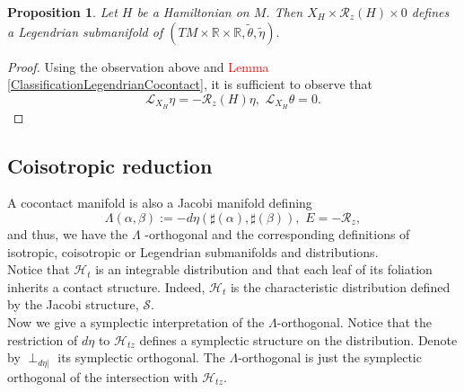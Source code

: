 \documentclass[12pt]{article}
\newtheorem{prop}{Proposition}[section]
\begin{document}
\begin{prop} Let $H$ be a Hamiltonian on $M$. Then $X_H \times \mathcal{R}_z(H) \times 0$ defines a Legendrian submanifold of $(TM \times \mathbb{R} \times \mathbb{R}, \widetilde \theta, \widetilde \eta).$
\end{prop}

 \begin{proof} Using the observation above and \textcolor{red}{Lemma \ref{ClassificationLegendrianCocontact}}, it is sufficient to observe that $$\mathcal{L}_{X_H}\eta = - \mathcal{R}_z(H) \eta, \,\, \mathcal{L}_{X_H}\theta =  0.$$
 \end{proof}


\subsection{Coisotropic reduction}
A cocontact manifold is also a Jacobi manifold defining $$\Lambda(\alpha, \beta) := -d\eta(\sharp(\alpha), \sharp(\beta)), \,\, E = -\mathcal{R}_z,$$ and thus, we have the $\Lambda$
-orthogonal and the corresponding definitions of isotropic, coiso\-tropic or Legendrian submanifolds and distributions.\\

Notice that $\mathcal{H}_t$ is an integrable distribution and that each leaf of its foliation inherits a contact structure. Indeed, $\mathcal{H}_t$ is the characteristic distribution defined by the Jacobi structure, $\mathcal{S}$. \\

Now we give a symplectic interpretation of the $\Lambda$-orthogonal. Notice that the restriction of $d\eta$ to $\mathcal{H}_{tz}$ defines a symplectic structure on the distribution. Denote by $\perp_{d\eta|}$ its symplectic orthogonal. The $\Lambda$-orthogonal is just the symplectic orthogonal of the intersection with $\mathcal{H}_{tz}$.\\
\end{document}
